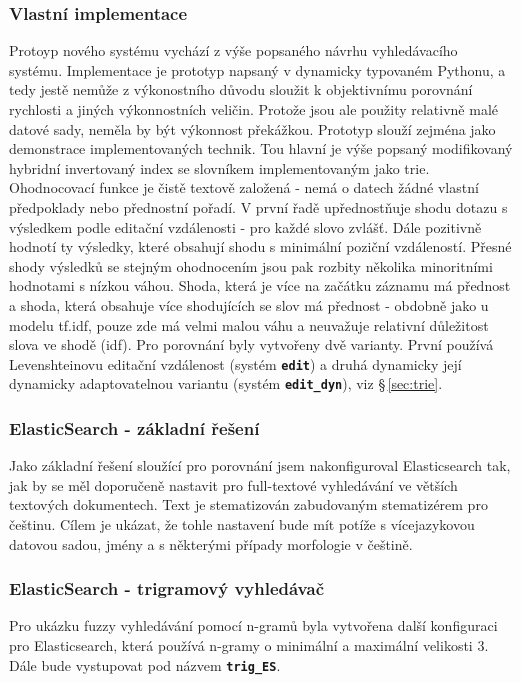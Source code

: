 \documentclass[11pt,letterpaper,oneside,openright]{book}
\newcommand{\bftt}[1]{\texttt{\textbf{#1}}}
\begin{document}
\subsubsection{Vlastní implementace}
Protoyp nového systému vychází z výše popsaného návrhu vyhledávacího systému.
Implementace je prototyp napsaný v dynamicky typovaném Pythonu, a tedy jestě
nemůže z výkonostního důvodu sloužit k objektivnímu porovnání rychlosti a
jiných výkonnostních veličin. Protože jsou ale použity relativně malé datové
sady, neměla by být výkonnost překážkou. Prototyp slouží zejména jako
demonstrace implementovaných technik. Tou hlavní je výše popsaný modifikovaný
hybridní invertovaný index se slovníkem implementovaným jako trie. Ohodnocovací
funkce je čistě textově založená - nemá o datech žádné vlastní předpoklady nebo
přednostní pořadí. V první řadě upřednostňuje shodu dotazu s výsledkem podle
editační vzdálenosti - pro každé slovo zvlášť. Dále pozitivně hodnotí ty
výsledky, které obsahují shodu s minimální poziční vzdáleností. Přesné shody
výsledků se stejným ohodnocením jsou pak rozbity několika minoritními hodnotami
s nízkou váhou. Shoda, která je více na začátku záznamu má přednost a shoda,
která obsahuje více shodujících se slov má přednost - obdobně jako u modelu
tf.idf, pouze zde má velmi malou váhu a neuvažuje relativní důležitost slova ve
shodě (idf). Pro porovnání byly vytvořeny dvě varianty. První používá
Levenshteinovu editační vzdálenost (systém \bftt{edit}) a druhá dynamicky její
dynamicky adaptovatelnou variantu (systém \bftt{edit\_dyn}), viz
\S\,\ref{sec:trie}.

\subsubsection{ElasticSearch - základní řešení}
Jako základní řešení sloužící pro porovnání jsem nakonfiguroval Elasticsearch
tak, jak by se měl doporučeně nastavit pro full-textové vyhledávání ve větších
textových dokumentech. Text je stematizován zabudovaným stematizérem pro
češtinu. Cílem je ukázat, že tohle nastavení bude mít potíže s vícejazykovou
datovou sadou, jmény a s některými případy morfologie v češtině.

\subsubsection{ElasticSearch - trigramový vyhledávač} \label{sec:trigram_implementation}
Pro ukázku fuzzy vyhledávání pomocí n-gramů byla vytvořena další konfiguraci
pro Elasticsearch, která používá n-gramy o minimální a maximální velikosti 3.
Dále bude vystupovat pod názvem \bftt{trig\_ES}.
\end{document}

